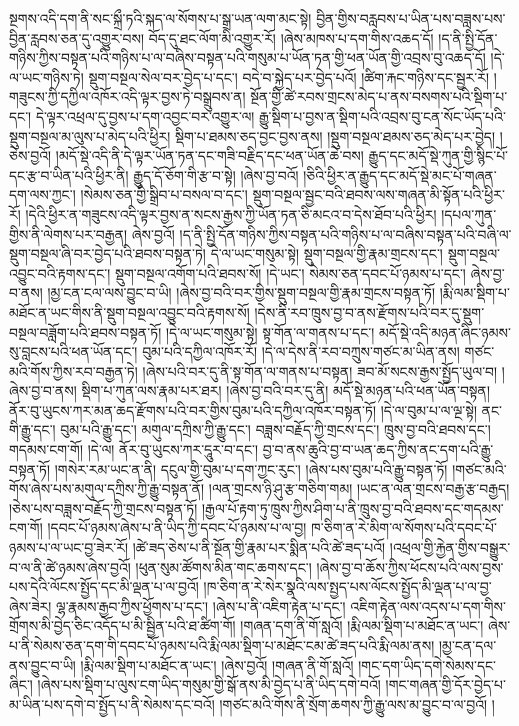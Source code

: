 སྔགས་འདི་དག་ནི་སང་སྐྲྀ་ཏའི་སྐད་ལ་སོགས་པ་སྒྲ་ཡན་ལག་མང་སྟེ། བྱིན་གྱིས་བརླབས་པ་ཡིན་པས་བཟླས་པས་བྱིན་རླབས་ཅན་དུ་འགྱུར་བས། བོད་དུ་ཐང་ལོག་མི་འགྱུར་རོ། །ཞེས་མཁས་པ་དག་གིས་འཆད་དོ། །ད་ནི་སྤྱི་དོན་གཉིས་ཀྱིས་བསྟན་པའི་གཉིས་པ་ལ་བཞིས་བསྟན་པའི་གསུམ་པ་ཡོན་ཏན་གྱི་ཕན་ཡོན་གྱི་འབྲས་བུ་འཆད་དོ། །དེ་ལ་ཡང་གཉིས་ཏེ། སྡུག་བསྔལ་སེལ་བར་བྱེད་པ་དང་། བདེ་བ་སྐྱེད་པར་བྱེད་པའོ། །ཚིག་རྐང་གཉིས་དང་སྦྱར་རོ། །གཟུངས་ཀྱི་དཀྱིལ་འཁོར་འདི་ལྟར་བྱས་ཏེ་བསྒྲུབས་ན། སྔོན་གྱི་ཚེ་རབས་གྲངས་མེད་པ་ནས་བསགས་པའི་སྡིག་པ་དང་། དེ་ལྟར་འཕྲལ་དུ་བྱས་པ་དག་འབྱང་བར་འགྱུར་ལ། རྒྱུ་སྡིག་པ་བྱས་ན་སྡིག་པའི་འབྲས་བུ་ངན་སོང་ཡོད་པའི་སྡུག་བསྔལ་མ་ལུས་པ་མེད་པའི་ཕྱིར། སྡིག་པ་ཐམས་ཅད་བྱང་བྱས་ནས། །སྡུག་བསྔལ་ཐམས་ཅད་མེད་པར་བྱེད། །ཅེས་བྱའོ། །མདོ་སྡེ་འདི་ནི་དེ་ལྟར་ཡོན་ཏན་དང་གཟི་བརྗིད་དང་ཕན་ཡོན་ཆེ་བས། རྒྱུད་དང་མདོ་སྡེ་ཀུན་གྱི་སྙིང་པོ་དང་རྩ་བ་ཡིན་པའི་ཕྱིར་ནི། རྒྱུད་དོ་ཅོག་གི་རྩ་བ་སྟེ། །ཞེས་བྱ་བའོ། །ཅིའི་ཕྱིར་ན་རྒྱུད་དང་མདོ་སྡེ་མང་པོ་གཞན་དག་ལས་ཀྱང་། །སེམས་ཅན་གྱི་སྒྲིབ་པ་བསལ་བ་དང་། སྡུག་བསྔལ་སྦྱང་བའི་ཐབས་ལས་གཞན་མི་སྟོན་པའི་ཕྱིར་རོ། །དེའི་ཕྱིར་ན་གཟུངས་འདི་ལྟར་བྱས་ན་སངས་རྒྱས་ཀྱི་ཡོན་ཏན་ཅི་མངའ་བ་དེས་ཐོབ་པའི་ཕྱིར། །དཔལ་ཀུན་གྱིས་ནི་ལེགས་པར་བརྒྱན། ཞེས་བྱའོ། །ད་ནི་སྤྱི་དོན་གཉིས་ཀྱིས་བསྟན་པའི་གཉིས་པ་ལ་བཞིས་བསྟན་པའི་བཞི་ལ་སྡུག་བསྔལ་ཞི་བར་བྱེད་པའི་ཐབས་བསྟན་ཏེ། དེ་ལ་ཡང་གསུམ་སྟེ། སྡུག་བསྔལ་གྱི་རྣམ་གྲངས་དང་། སྡུག་བསྔལ་འབྱུང་བའི་རྟགས་དང་། སྡུག་བསྔལ་འགོག་པའི་ཐབས་སོ། །དེ་ཡང་། སེམས་ཅན་དབང་པོ་ཉམས་པ་དང་། ཞེས་བྱ་བ་ནས། །མྱ་ངན་ངལ་ལས་བྱུང་བ་ཡི། །ཞེས་བྱ་བའི་བར་གྱིས་སྡུག་བསྔལ་གྱི་རྣམ་གྲངས་བསྟན་ཏོ། །རྨི་ལམ་སྡིག་པ་མཐོང་ན་ཡང་གིས་ནི་སྡུག་བསྔལ་འབྱུང་བའི་རྟགས་སོ། །དེས་ནི་རབ་ཁྲུས་བྱ་བ་ནས་རྫོགས་པའི་བར་དུ་སྡུག་བསྔལ་བཟློག་པའི་ཐབས་བསྟན་ཏོ། །དེ་ལ་ཡང་གསུམ་སྟེ། སྟ་གོན་ལ་གནས་པ་དང་། མདོ་སྡེ་འདི་མཉན་ཞིང་ཉམས་སུ་བླངས་པའི་ཕན་ཡོན་དང་། བུམ་པའི་དཀྱིལ་འཁོར་རོ། །དེ་ལ་དེས་ནི་རབ་བཀྲུས་གཙང་མ་ཡིན་ནས། གཙང་མའི་གོས་ཀྱིས་རབ་བརྒྱན་ཏེ། །ཞེས་པའི་བར་དུ་ནི་སྟ་གོན་ལ་གནས་པ་བསྟན། ཟབ་མོ་སངས་རྒྱས་སྤྱོད་ཡུལ་བ། །ཞེས་བྱ་བ་ནས། སྡིག་པ་ཀུན་ལས་རྣམ་པར་ཐར། །ཞེས་བྱ་བའི་བར་དུ་ནི། མདོ་སྡེ་མཉན་པའི་ཕན་ཡོན་བསྟན། ནོར་བུ་ཡུངས་ཀར་མན་ཆད་རྫོགས་པའི་བར་གྱིས་བུམ་པའི་དཀྱིལ་འཁོར་བསྟན་ཏོ། །དེ་ལ་བུམ་པ་ལ་ལྔ་སྟེ། ནང་གི་རྒྱུ་དང་། བུམ་པའི་རྒྱུ་དང་། མགུལ་དཀྲིས་ཀྱི་རྒྱུ་དང་། བཟླས་བརྗོད་ཀྱི་གྲངས་དང་། ཁྲུས་བྱ་བའི་ཐབས་དང་། གདམས་ངག་གོ། །དེ་ལ། ནོར་བུ་ཡུངས་ཀར་དཱུར་བ་དང་། བྱ་བ་ནས་ཆུའི་བྱ་བ་ཡན་ཆད་ཀྱིས་ནང་དག་པའི་རྒྱུ་བསྟན་ཏོ། །གསེར་རམ་ཡང་ན་ནི། དངུལ་གྱི་བུམ་པ་དག་ཀྱང་རུང་། །ཞེས་པས་བུམ་པའི་རྒྱུ་བསྟན་ཏོ། །གཙང་མའི་གོས་ཞེས་པས་མགུལ་དཀྲིས་ཀྱི་རྒྱུ་བསྟན་ནོ། །ལན་གྲངས་ཉི་ཤུ་རྩ་གཅིག་གམ། །ཡང་ན་ལན་གྲངས་བརྒྱ་རྩ་བརྒྱད། །ཅེས་པས་བཟླས་བརྗོད་ཀྱི་གྲངས་བསྟན་ཏོ། །རྒྱལ་པོ་རྟག་ཏུ་ཁྲུས་ཀྱིས་ཤིག་པ་ནི་ཁྲུས་བྱ་བའི་ཐབས་དང་གདམས་ངག་གོ། །དབང་པོ་ཉམས་ཞེས་པ་ནི་ཡིད་ཀྱི་དབང་པོ་ཉམས་པ་ལ་བྱ། ཁ་ཅིག་ན་རེ་མིག་ལ་སོགས་པའི་དབང་པོ་ཉམས་པ་ལ་ཡང་བྱ་ཟེར་རོ། །ཚེ་ཟད་ཅེས་པ་ནི་སྔོན་གྱི་རྣམ་པར་སྨིན་པའི་ཚེ་ཟད་པའོ། །འཕྲལ་གྱི་རྐྱེན་གྱིས་བསྒྱུར་བ་ལ་ནི་ཚེ་ཉམས་ཞེས་བྱའོ། །ཕུན་སུམ་ཚོགས་མིན་གང་ཆགས་དང་། །ཞེས་བྱ་བ་ཆོས་ཀྱིས་ཕོངས་པའི་ལས་བྱས་པས་དེའི་ལོངས་སྤྱོད་དང་མི་ལྡན་པ་ལ་བྱའོ། །ཁ་ཅིག་ན་རེ་སེར་སྣའི་ལས་སྤྱད་པས་ལོངས་སྤྱོད་མི་ལྡན་པ་ལ་བྱ་ཞེས་ཟེར། ལྷ་རྣམས་རྒྱབ་ཀྱིས་ཕྱོགས་པ་དང་། །ཞེས་པ་ནི་འཇིག་རྟེན་པ་དང་། འཇིག་རྟེན་ལས་འདས་པ་དག་གིས་གྲོགས་མི་བྱེད་ཅིང་འདོད་པ་མི་སྦྱིན་པའི་ཐ་ཚིག་གོ། །གཞན་དག་ནི་གོ་སླའོ། །རྨི་ལམ་སྡིག་པ་མཐོང་ན་ཡང་། ཞེས་པ་ནི་སེམས་ཅན་དག་གི་དབང་པོ་ཉམས་པའི་རྨི་ལམ་སྡིག་པ་མཐོང་ངམ་ཚེ་ཟད་པའི་རྨི་ལམ་ནས། །མྱ་ངན་དལ་ནས་བྱུང་བ་ཡི། །རྨི་ལམ་སྡིག་པ་མཐོང་ན་ཡང་། །ཞེས་བྱའོ། །གཞན་ནི་གོ་སླའོ། །གང་དག་ཡིད་དགེ་སེམས་དང་ཞིང་། །ཞེས་པས་སྡིག་པ་ལུས་ངག་ཡིད་གསུམ་གྱི་སྒོ་ནས་མི་བྱེད་པ་ནི་ཡིད་དགེ་བའོ། །གང་གཞན་གྱི་དོར་བྱེད་པ་མ་ཡིན་པས་དགེ་བ་སྤྱོད་པ་ནི་སེམས་དང་བའོ། །གཙང་མའི་གོས་ནི་སྲོག་ཆགས་ཀྱི་རྒྱུ་ལས་མ་བྱུང་བ་ལ་བྱའོ། །
